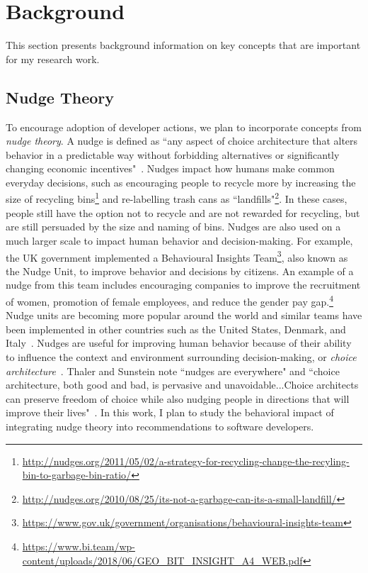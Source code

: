 \section{Background}

This section presents background information on key concepts that are important for my research work.

\subsection{Nudge Theory}

To encourage adoption of developer actions, we plan to incorporate concepts from \textit{nudge theory}. A nudge is defined as ``any aspect of choice architecture that alters behavior in a predictable way without forbidding alternatives or significantly changing economic incentives"~\cite[p.~6]{sunstein2008nudge}. Nudges impact how humans make common everyday decisions, such as encouraging people to recycle more by increasing the size of recycling bins\footnote{\url{http://nudges.org/2011/05/02/a-strategy-for-recycling-change-the-recyling-bin-to-garbage-bin-ratio/}} and re-labelling trash cans as ``landfills"\footnote{\url{http://nudges.org/2010/08/25/its-not-a-garbage-can-its-a-small-landfill/}}. In these cases, people still have the option not to recycle and are not rewarded for recycling, but are still persuaded by the size and naming of bins. Nudges are also used on a much larger scale to impact human behavior and decision-making. For example, the UK government implemented a Behavioural Insights Team\footnote{\url{https://www.gov.uk/government/organisations/behavioural-insights-team}}, also known as the Nudge Unit, to improve behavior and decisions by citizens. An example of a nudge from this team includes encouraging companies to improve the recruitment of women, promotion of female employees, and reduce the gender pay gap.\footnote{\url{https://www.bi.team/wp-content/uploads/2018/06/GEO\_BIT\_INSIGHT\_A4\_WEB.pdf}} Nudge units are becoming more popular around the world and similar teams have been implemented in other countries such as the United States, Denmark, and Italy~\cite{DelBalzoNudging}. Nudges are useful for improving human behavior because of their ability to influence the context and environment surrounding decision-making, or \textit{choice architecture}~\cite{thaler2014choice}. Thaler and Sunstein note ``nudges are everywhere" and ``choice architecture, both good and bad, is pervasive and unavoidable...Choice architects can preserve freedom of choice while also nudging people in directions that will improve their lives"~\cite[p.~255]{sunstein2008nudge}. In this work, I plan to study the behavioral impact of integrating nudge theory into recommendations to software developers.

